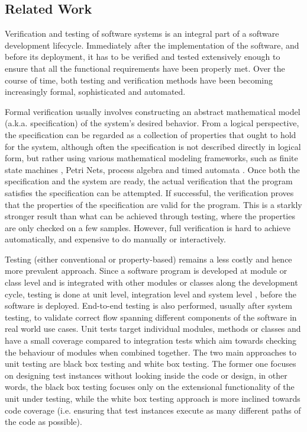 \raggedbottom
\subsection{Related Work}

Verification and testing of software systems \cite{myers2011art} is an integral part of a software development lifecycle. Immediately after the implementation of the software, and before its deployment, it has to be verified and tested extensively enough to ensure that all the functional requirements have been properly met. Over the course of time, both testing and verification methods have been becoming increasingly formal, sophisticated and automated. 

Formal verification usually involves constructing an abstract mathematical model (a.k.a. specification) of the system's desired behavior. From a logical perspective, the specification can be regarded as a collection of properties that ought to hold for the system, although often the specification is not described directly in logical form, but rather using various mathematical modeling frameworks, such as finite state machines \cite{chow1978testing}, Petri Nets, process algebra and timed automata \cite{clarke1996formal}. Once both the specification and the system are ready, the actual verification that the program satisfies the specification can be attempted. If successful, the verification proves that the properties of the specification are valid for the program. This is a starkly stronger result than what can be achieved through testing, where the properties are only checked on a few samples. However, full verification is hard to achieve automatically, and expensive to do manually or interactively.

Testing (either conventional or property-based) remains a less costly and hence more prevalent approach. Since a software program is developed at module or class level and is integrated with other modules or classes along the development cycle, testing is done at unit level, integration level and system level \cite{myers2011art}, before the software is deployed. End-to-end testing \cite{tsai2001end} is also performed, usually after system testing,%
to validate correct flow spanning different components of the software in real world use cases. Unit tests target individual modules, methods or classes and have a small coverage compared to integration tests which aim towards checking the behaviour of modules when combined together. The two main approaches to unit testing are black box testing and white box testing. The former one focuses on designing test instances without looking inside the code or design, in other words, the black box testing focuses only on the extensional functionality of the unit under testing, while the white box testing approach is more inclined towards code coverage (i.e. ensuring that test instances execute as many different paths of the code as possible).

